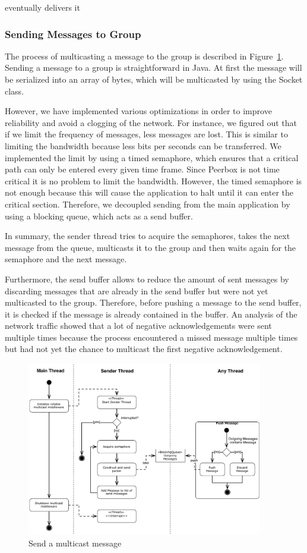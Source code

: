eventually delivers it

\subsubsection{Sending Messages to Group}

The process of multicasting a message to the group is described in Figure~\ref{fig:sendMessage}. Sending a message to a group is straightforward in Java. At first the message will be serialized into an array of bytes, which will be multicasted by using the Socket class. 

However, we have implemented various optimizations in order to improve reliability and avoid a clogging of the network. For instance, we figured out that if we limit the frequency of messages, less messages are lost. This is similar to limiting the bandwidth because less bits per seconds can be transferred.  
We implemented the limit by using a timed semaphore, which ensures that a critical path can only be entered every given time frame. Since Peerbox is not time critical it is no problem to limit the bandwidth. 
However, the timed semaphore is not enough because this will cause the application to halt until it can enter the critical section. Therefore, we decoupled  sending from the main application by using a blocking queue, which acts as a send buffer. 

In summary, the sender thread tries to acquire the semaphores, takes the next message from the queue, multicasts it to the group and then waits again for the semaphore and the next message. 

Furthermore, the send buffer allows to reduce the amount of sent messages by discarding messages that are already in the send buffer but were not yet multicasted to the group. Therefore, before pushing a message to the send buffer, it is checked if the message is already contained in the buffer.
An analysis of the network traffic showed that a lot of negative acknowledgements were sent multiple times because the process encountered a missed message multiple times but had not yet the chance to multicast the first negative acknowledgement. 

\begin{figure}[htbp]
    \centering
        \includegraphics[height=3in]{figures/sendMessage.pdf}
    \caption{Send a multicast message}
    \label{fig:sendMessage}
\end{figure}
  

